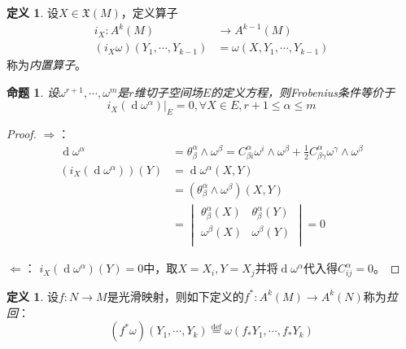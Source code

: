 \documentclass[winfonts,UTF8,c5size,a4paper,fancyhdr,hyperref,titlepage,nocap]{ctexart}
\newtheorem{prop}[thm]{命题}
\theoremstyle{definition}
\newtheorem{defn}[thm]{定义}
\theoremstyle{remark}
\numberwithin{equation}{subsection}
\newcommand{\red}{\color{red}}
\newcommand{\dd}{\operatorname{d}}
\newcommand{\Xf}[1]{\mathfrak{X}(#1)}
\newcommand{\local}[2]{\left.{#1}\right|_{#2}}%
\newcommand{\defeq}{\stackrel{{\mathrm{def}}}{=}}
\begin{document}
\begin{defn}
  设$X\in\Xf{M}$，定义算子
\begin{align*}
i_X\colon A^k(M)&\longrightarrow A^{k-1}(M)\\
(i_X\omega)(Y_1,\cdots,Y_{k-1})&=\omega(X,Y_1,\cdots,Y_{k-1})
\end{align*}
称为\emph{\red 内置算子}。
\end{defn}
\begin{prop}
  设$\omega^{r+1},\cdots,\omega^m$是$r$维切子空间场$E$的定义方程，则Frobenius条件等价于
  \begin{equation*}
    \local{i_X(\dd\omega^{\alpha})}{E}=0,\forall X\in E, r+1\leqslant\alpha\leqslant m
  \end{equation*}
\end{prop}
\begin{proof}
  $\Longrightarrow$：
\begin{align*}
\dd\omega^{\alpha}&=\theta^{\alpha}_{\beta}\wedge\omega^{\beta}=C^{\alpha}_{\beta i}\omega^i\wedge\omega^{\beta}+\frac{1}{2}C^{\alpha}_{\beta\gamma}\omega^{\gamma}\wedge\omega^{\beta}\\
(i_X(\dd\omega^{\alpha}))(Y)&=\dd\omega^{\alpha}(X,Y)\\
                            &=(\theta^{\alpha}_{\beta}\wedge\omega^{\beta})(X,Y)\\
                            &=
                \begin{vmatrix}
                 \theta^{\alpha}_{\beta}(X) & \theta^{\alpha}_{\beta}(Y) \\
                 \omega^{\beta}(X) & \omega^{\beta}(Y) \\
                \end{vmatrix}=0
\end{align*}

$\Longleftarrow$：
$i_X(\dd\omega^{\alpha})(Y)=0$中，取$X=X_i,Y=X_j$并将$\dd\omega^{\alpha}$代入得$C^{\alpha}_{ij}=0$。
\end{proof}

\begin{defn}
  设$f\colon N\to M$是光滑映射，则如下定义的$f^{\ast}\colon A^k(M)\to A^k(N)$称为\emph{\red 拉回}：
   \begin{equation*}
    (f^{\ast}\omega)(Y_1,\cdots,Y_k)\defeq\omega(f_{\ast}Y_1,\cdots,f_{\ast}Y_k)
   \end{equation*}
\end{defn}
\end{document}
